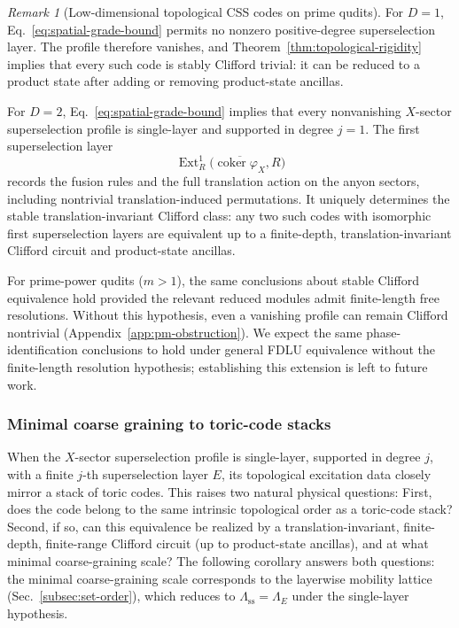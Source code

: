 \documentclass[aps,prx,english,superscriptaddress,twocolumn,tightenlines,showpacs,longbibliography,floatfix,amsfonts]{revtex4-2}
\theoremstyle{remark}
\newtheorem{remark}{Remark}
\theoremstyle{definition}
\begin{document}
\begin{remark}[Low-dimensional topological CSS codes on prime qudits]
    \label{rem:rigidity-interpretation}
    For \(D=1\),
    Eq.~\eqref{eq:spatial-grade-bound} permits no nonzero positive-degree
    superselection layer. The profile therefore vanishes, and
    Theorem~\ref{thm:topological-rigidity} implies that every such code is
    stably Clifford trivial: it can be reduced to a product state after
    adding or removing product-state ancillas.

    For \(D=2\),
    Eq.~\eqref{eq:spatial-grade-bound} implies that every nonvanishing
    \(X\)-sector superselection profile is single-layer and supported in degree \(j=1\).
    The first superselection layer
    \begin{equation}
        \operatorname{Ext}_R^1\!\bigl(\overline{\operatorname{coker}\varphi_X},R\bigr)
    \end{equation}
    records the fusion rules and the full translation action on the anyon
    sectors, including nontrivial translation-induced permutations. It
    uniquely determines the stable translation-invariant Clifford class: any two such codes with isomorphic first superselection layers
    are equivalent up to a finite-depth, translation-invariant Clifford
    circuit and product-state ancillas.
\end{remark}

For prime-power qudits (\(m>1\)), the same conclusions about stable
Clifford equivalence hold provided the relevant reduced modules admit
finite-length free resolutions. Without this hypothesis, even a vanishing
profile can remain Clifford nontrivial
(Appendix~\ref{app:pm-obstruction}). We expect the same phase-identification
conclusions to hold under general FDLU equivalence without the finite-length
resolution hypothesis; establishing this extension is left to future work.


\subsubsection{Minimal coarse graining to toric-code stacks}
\label{subsubsec:minimal-coarse-graining}


When the $X$-sector superselection profile is single-layer, supported in degree $j$, with a finite \(j\)-th superselection layer $E$, its topological excitation data closely mirror a stack of toric codes. This raises two natural physical questions: First, does the code belong to the same intrinsic topological order as a toric-code stack? Second, if so, can this equivalence be realized by a translation-invariant, finite-depth, finite-range Clifford circuit (up to product-state ancillas), and at what minimal coarse-graining scale? The following corollary answers both questions: the minimal coarse-graining scale corresponds to the layerwise mobility lattice (Sec.~\ref{subsec:set-order}), which reduces to $\Lambda_{\mathrm{ss}}=\Lambda_E$ under the single-layer hypothesis.
\end{document}
